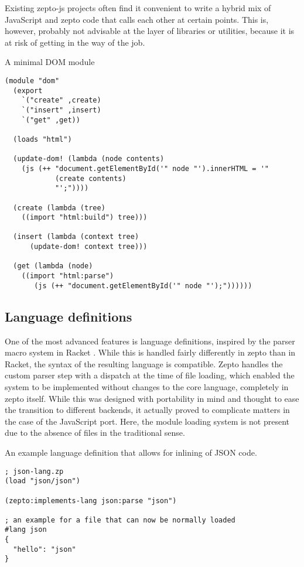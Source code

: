 \documentclass[oneside,11pt,xetex]{scrbook}
\begin{document}
Existing zepto-js projects often find it convenient to write a hybrid mix
of JavaScript and zepto code that calls each other at certain points.
This is, however, probably not advisable at the layer of libraries or
utilities, because it is at risk of getting in the way of the job.

\begin{listing}[H]
\caption{A minimal DOM module}
\begin{verbatim}
(module "dom"
  (export
    `("create" ,create)
    `("insert" ,insert)
    `("get" ,get))

  (loads "html")

  (update-dom! (lambda (node contents)
    (js (++ "document.getElementById('" node "').innerHTML = '"
            (create contents)
            "';"))))

  (create (lambda (tree)
    ((import "html:build") tree)))

  (insert (lambda (context tree)
      (update-dom! context tree)))

  (get (lambda (node)
    ((import "html:parse")
       (js (++ "document.getElementById('" node "');"))))))
\end{verbatim}
\end{listing}

\subsection{Language definitions}

One of the most advanced features is language definitions, inspired by
the parser macro system in Racket \parencite{RPM}. While this is handled
fairly differently in zepto than in Racket, the syntax of the resulting
language is compatible. Zepto handles the custom parser step with a dispatch
at the time of file loading, which enabled the system to be implemented without
changes to the core language, completely in zepto itself. While this was 
designed with portability in mind and thought to ease the transition to
different backends, it actually proved to complicate matters in the case
of the JavaScript port. Here, the module loading system is not present due
to the absence of files in the traditional sense.

\begin{listing}[H]
\caption{An example language definition that allows for inlining of JSON code.}
\begin{verbatim}
; json-lang.zp
(load "json/json")

(zepto:implements-lang json:parse "json")

; an example for a file that can now be normally loaded
#lang json
{
  "hello": "json"
}
\end{verbatim}
\end{listing}
\end{document}
